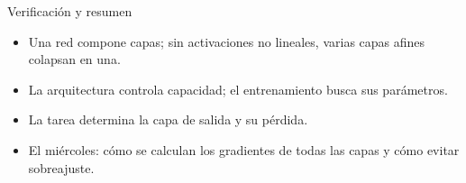 \documentclass[10pt,aspectratio=169,xcolor={dvipsnames}]{beamer}
\begin{document}
\begin{frame}{Verificación y resumen}
\begin{itemize}
\item Una red compone capas; sin activaciones no lineales, varias capas afines colapsan en una.
\item La arquitectura controla capacidad; el entrenamiento busca sus parámetros.
\item La tarea determina la capa de salida y su pérdida.
\item El miércoles: cómo se calculan los gradientes de todas las capas y cómo evitar sobreajuste.
\end{itemize}
\end{frame}
\end{document}
